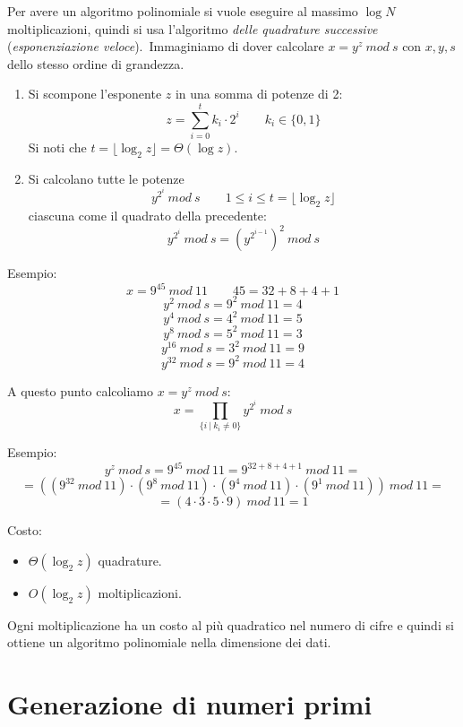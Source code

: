 Per avere un algoritmo polinomiale si vuole eseguire al massimo $\log N$ moltiplicazioni, quindi si usa l'algoritmo \textit{delle quadrature successive} (\textit{esponenziazione veloce}).\
Immaginiamo di dover calcolare $x = y^z\ \mathit{mod}\ s$ con $x,y,s$  dello stesso ordine di grandezza.\

\begin{enumerate}
    \item Si scompone l'esponente $z$ in una somma di potenze di 2:
          \[z = \sum_{i=0}^t k_i\cdot 2^i\qquad k_i \in \{0,1\}\]
          Si noti che $t = \lfloor\log_2 z\rfloor = \Theta(\log z)$.\
    \item Si calcolano tutte le potenze
          \[y^{2^i}\ \mathit{mod}\ s\qquad 1 \leq i \leq t = \lfloor\log_2 z\rfloor\]
          ciascuna come il quadrato della precedente:
          \[y^{2^i}\ \mathit{mod}\ s = \left(y^{2^{i-1}}\right)^2\ \mathit{mod}\ s\]
\end{enumerate}

\noindent Esempio:
\[x = 9^{45}\ \mathit{mod}\ 11 \qquad 45 = 32 + 8+ 4 + 1\]
\[y^2\ \mathit{mod}\ s = 9^2\ \mathit{mod}\ 11 = 4\]
\[y^4\ \mathit{mod}\ s = 4^2\ \mathit{mod}\ 11 = 5\]
\[y^8\ \mathit{mod}\ s = 5^2\ \mathit{mod}\ 11 = 3\]
\[y^{16}\ \mathit{mod}\ s = 3^2\ \mathit{mod}\ 11 = 9\]
\[y^{32}\ \mathit{mod}\ s = 9^2\ \mathit{mod}\ 11 = 4\]

\noindent A questo punto calcoliamo $x = y^z\ \mathit{mod}\ s$:
\[x = \prod_{\{i\ |\ k_i \neq 0\}}y^{2^i}\ \mathit{mod}\ s\]

\noindent Esempio:
\[y^z\ \mathit{mod}\ s = 9^{45}\ \mathit{mod}\ 11 = 9^{32 + 8 + 4 + 1}\ \mathit{mod}\ 11 = \]
\[= \left(\left(9^{32}\ \mathit{mod}\ 11\right) \cdot \left(9^8\ \mathit{mod}\ 11\right) \cdot \left(9^4\ \mathit{mod}\ 11\right) \cdot \left(9^1\ \mathit{mod}\ 11\right)\right)\  \mathit{mod}\ 11 = \]
\[= (4 \cdot 3 \cdot 5 \cdot 9)\ \mathit{mod}\ 11 = 1\]

\noindent Costo:
\begin{itemize}
    \item $\Theta(\log_2z)$ quadrature.
    \item $O(\log_2z)$ moltiplicazioni.
\end{itemize}
Ogni moltiplicazione ha un costo al più quadratico nel numero di cifre e quindi si ottiene un algoritmo polinomiale nella dimensione dei dati.\

\section{Generazione di numeri primi}

